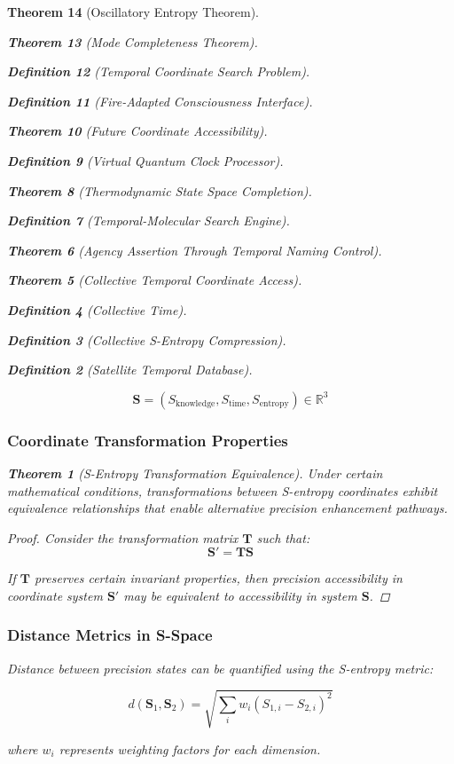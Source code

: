 \documentclass[12pt,a4paper]{article}
\newtheorem{theorem}{Theorem}[section]
\newtheorem{definition}[theorem]{Definition}
\begin{document}
\begin{theorem}[Oscillatory Entropy Theorem]
\begin{theorem}[Mode Completeness Theorem]
\begin{enumerate}
\begin{definition}[Temporal Coordinate Search Problem]
\begin{algorithm}
\begin{definition}[Fire-Adapted Consciousness Interface]
\begin{theorem}[Future Coordinate Accessibility]
\begin{definition}[Virtual Quantum Clock Processor]
\begin{itemize}
\begin{itemize}
\begin{theorem}[Thermodynamic State Space Completion]
\begin{definition}[Temporal-Molecular Search Engine]
\begin{theorem}[Agency Assertion Through Temporal Naming Control]
\begin{remark}
\begin{theorem}[Collective Temporal Coordinate Access]
\begin{definition}[Collective Time]
\begin{definition}[Collective S-Entropy Compression]
\begin{definition}[Satellite Temporal Database]
\begin{algorithm}
\begin{table}[h]
{{\begin{equation}
\mathbf{S} = (S_{\text{knowledge}}, S_{\text{time}}, S_{\text{entropy}}) \in \mathbb{R}^3
\label{eq:tri_dimensional_coordinates}
\end{equation}

\subsubsection{Coordinate Transformation Properties}

\begin{theorem}[S-Entropy Transformation Equivalence]
Under certain mathematical conditions, transformations between S-entropy coordinates exhibit equivalence relationships that enable alternative precision enhancement pathways.
\end{theorem}

\begin{proof}
Consider the transformation matrix $\mathbf{T}$ such that:
\begin{equation}
\mathbf{S}' = \mathbf{T} \mathbf{S}
\label{eq:coordinate_transformation}
\end{equation}

If $\mathbf{T}$ preserves certain invariant properties, then precision accessibility in coordinate system $\mathbf{S}'$ may be equivalent to accessibility in system $\mathbf{S}$.
\end{proof}

\subsubsection{Distance Metrics in S-Space}

Distance between precision states can be quantified using the S-entropy metric:

\begin{equation}
d(\mathbf{S}_1, \mathbf{S}_2) = \sqrt{\sum_{i} w_i (S_{1,i} - S_{2,i})^2}
\label{eq:s_entropy_distance}
\end{equation}

where $w_i$ represents weighting factors for each dimension.

}}
\end{table}
\end{algorithm}
\end{definition}
\end{definition}
\end{definition}
\end{theorem}
\end{remark}
\end{theorem}
\end{definition}
\end{theorem}
\end{itemize}
\end{itemize}
\end{definition}
\end{theorem}
\end{definition}
\end{algorithm}
\end{definition}
\end{enumerate}
\end{theorem}
\end{theorem}
\end{document}
